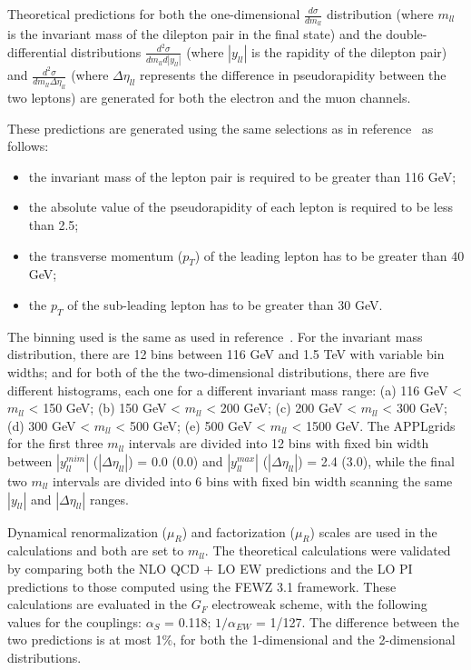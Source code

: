 Theoretical predictions for both the one-dimensional $\frac{d\sigma}{dm_{ll}}$ distribution 
(where $m_{ll}$ is the invariant mass of the dilepton pair in the final state) and the double-differential 
distributions $\frac{d^{2}\sigma}{dm_{ll}d|y_{ll}|}$ (where $|y_{ll}|$ is the rapidity of the dilepton pair) 
and $\frac{d^{2}\sigma}{dm_{ll}\Delta\eta_{ll}}$ (where $\Delta\eta_{ll}$ represents the difference in 
pseudorapidity between the two leptons) are generated for both the electron and the muon channels.
 
These predictions are generated using the same selections as in reference~\cite{jhep08-2016-009}
as follows:
\begin{itemize}
\item the invariant mass of the lepton pair is required to be greater than 116 GeV;
\item the absolute value of the pseudorapidity of each lepton is required to be less than 2.5;
\item the transverse momentum ($p_{T}$) of the leading lepton has to be greater than 40 GeV;
\item the $p_{T}$ of the sub-leading lepton has to be greater than 30 GeV.
\end{itemize} 
The binning used is the same as used in reference~\cite{jhep08-2016-009}. For the invariant mass 
distribution, there are 12 bins between 116 GeV and 1.5 TeV with variable bin widths; and for both of the 
 the two-dimensional distributions, there are five different histograms, each one for a different invariant
 mass range: (a) 116 GeV < $m_{ll}$ < 150 GeV; (b) 150 GeV < $m_{ll}$ < 200 GeV; (c) 200 GeV < $m_{ll}$ < 300 GeV; (d) 300 GeV < $m_{ll}$ < 500 GeV; (e) 500 GeV < $m_{ll}$ < 1500 GeV.
 The APPLgrids for the first three $m_{ll}$ intervals are divided into 12 bins with fixed bin 
width between $|y_{ll}^{mim}|$ ($|\Delta\eta_{ll}|$)  = 0.0 (0.0) and $|y_{ll}^{max}|$ ($|\Delta\eta_{ll}|$) = 2.4 (3.0), while the final two $m_{ll}$ intervals are divided into 6 bins with fixed bin width scanning the same $|y_{ll}|$ and $|\Delta\eta_{ll}|$ ranges.

Dynamical renormalization ($\mu_{R}$) and factorization ($\mu_{R}$) scales are used in the calculations 
and both are set to $m_{ll}$. The theoretical calculations were validated by comparing both the NLO QCD + LO EW predictions and the 
LO PI predictions to those computed using the FEWZ 3.1 framework. These calculations are evaluated in the $G_{F}$ electroweak scheme, with the following values for the couplings:
 $\alpha_{S}$ = 0.118; $1/\alpha_{EW}$ = 1/127. The difference between the two predictions is at most 1${\%}$, for both the 1-dimensional and the 2-dimensional distributions.

